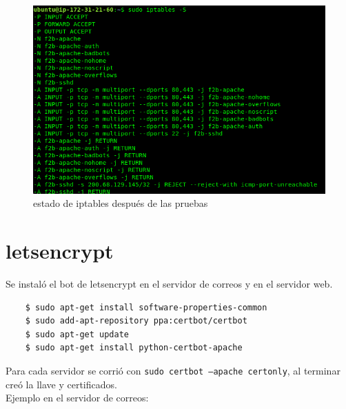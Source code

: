 \documentclass[9pt]{article}
\begin{document}
\begin{figure}[H]
  \centering
  \includegraphics[scale=0.3]{fail2ban/new_iptables_with_ban}
  \caption{estado de iptables después de las pruebas}
\end{figure}

\newpage

\section{letsencrypt}

Se instaló el bot de \textsf{letsencrypt} en el servidor de correos y en el servidor web.

\begin{verbatim}
    $ sudo apt-get install software-properties-common
    $ sudo add-apt-repository ppa:certbot/certbot
    $ sudo apt-get update
    $ sudo apt-get install python-certbot-apache 
\end{verbatim}

Para cada servidor se corrió con \texttt{sudo certbot --apache certonly}, al terminar creó la llave y certificados. \\

Ejemplo en el servidor de correos:
\end{document}
